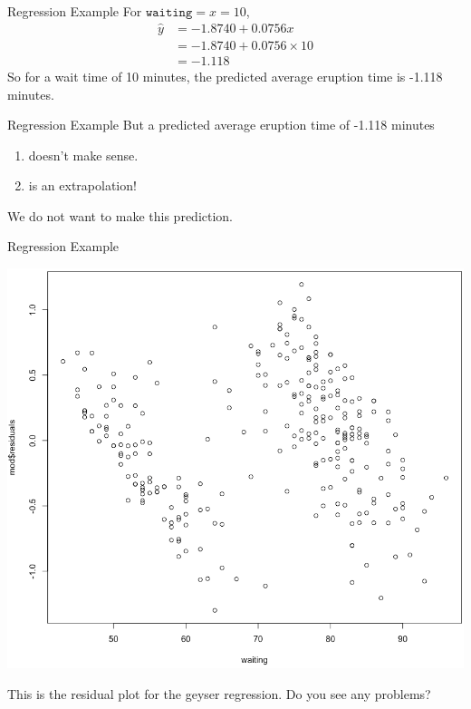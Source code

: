 \begin{frame}{Regression Example}
    For $\texttt{waiting}=x=10$,
    \begin{align*}
        \hat{y} &= -1.8740 + 0.0756 x \\
        &= -1.8740 + 0.0756 \times 10 \\
        &= -1.118
    \end{align*}
    So for a wait time of 10 minutes, the predicted average eruption time is -1.118 minutes.
\end{frame}

\begin{frame}{Regression Example}
    But a predicted average eruption time of -1.118 minutes
    \begin{enumerate}
        \item doesn't make sense.
        \item is an extrapolation!
    \end{enumerate}
    We do not want to make this prediction.
\end{frame}

\begin{frame}{Regression Example}
    \vspace{-18pt}\begin{center}
        \includegraphics[scale=0.25]{images/geyserResid.png}
    \end{center}
    \vspace{-12pt}This is the residual plot for the geyser regression. Do you see any problems?
\end{frame}


